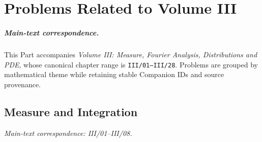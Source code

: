 \chapter{Problems Related to Volume III}
\label{ch:companion-iii}

\paragraph{Main-text correspondence.}
This Part accompanies \emph{Volume III: Measure, Fourier Analysis, Distributions and PDE}, whose canonical chapter range is \texttt{III/01--III/28}. Problems are grouped by mathematical theme while retaining stable Companion IDs and source provenance.

\section{Measure and Integration}
\noindent\textit{Main-text correspondence: III/01--III/08.}

